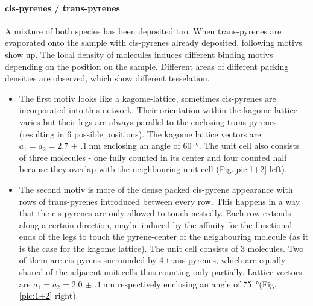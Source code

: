 \paragraph {cis-pyrenes / trans-pyrenes}
A mixture of both species has been deposited too. When trans-pyrenes are evaporated onto the sample with cis-pyrenes already deposited, following motivs show up. The local density of molecules induces different binding motivs depending on the position on the sample. Different areas of different packing densities are observed, which show different tesselation. 
\begin{itemize}
\item The first motiv looks like a kagome-lattice, sometimes cis-pyrenes are incorporated into this network. Their orientation within the kagome-lattice varies but their legs are always parallel to the enclosing trans-pyrenes (resulting in 6 possible positions). The kagome lattice vectors are $a_1 = a_2 = \SI{2.7(1)}{\nano \meter}$ enclosing an angle of \SI{60}{\degree}. The unit cell also consists of three molecules - one fully counted in its center and four counted half because they overlap with the neighbouring unit cell (Fig.\ref{pic:1+2} left).
\item The second motiv is more of the dense packed cis-pyrene appearance with rows of trans-pyrenes introduced between every row. This happens in a way that the cis-pyrenes are only allowed to touch nestedly. Each row extends along a certain direction, maybe induced by the affinity for the functional ends of the legs to touch the pyrene-center of the neighbouring molecule (as it is the case for the kagome lattice). The unit cell consists of 3 molecules. Two of them are cis-pyrens surrounded by 4 trans-pyrenes, which are equally shared of the adjacent unit cells thus counting only partially. Lattice vectors are  $a_1 = a_2 = \SI{2.0(1)}{\nano \meter}$ respectively enclosing an angle of \SI{75}{\degree}(Fig.\ref{pic:1+2} right).
\end{itemize}


